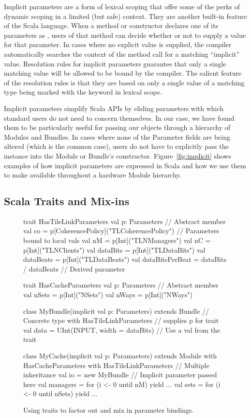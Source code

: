Implicit parameters are a form of lexical scoping that offer some of the perks of dynamic scoping in a limited (but safe) context.
They are another built-in feature of the Scala language.
When a method or constructor declares one of its parameters as , 
users of that method can decide whether or not to supply a value for that parameter.
In cases where no explicit value is supplied, the compiler automatically searches the context
of the method call for a matching ``implicit'' value.
Resolution rules for implicit parameters guarantee that only a single matching value will be allowed to be bound by the compiler.
The salient feature of the  resolution rules is that they are based on only
a single value of a matching type being marked with the  keyword in lexical scope.

Implicit parameters simplify Scala APIs by eliding parameters with which standard users do not need to concern themselves.
In our case, we have found them to be particularly useful for passing our  objects through a hierarchy of Modules and Bundles.
In cases where none of the Parameter fields are being altered (which is the common case),
users do not have to explicitly pass the  instance into the Module or Bundle's constructor.
Figure~\ref{fig:implicit} shows examples of how implicit parameters are expressed in Scala and how we use them to make 
available throughout a hardware Module hierarchy.
  
\subsection{Scala Traits and Mix-ins}

\begin{figure}
\centering
\begin{scala}
trait HasTileLinkParameters {
  val p: Parameters // Abstract member
  val co = p[CoherencePolicy]("TLCoherencePolicy") // Parameters bound to local vals
  val nM = p[Int]("TLNManagers")
  val nC = p[Int]("TLNClients")
  val dataBits = p[Int]("TLDataBits")
  val dataBeats = p[Int]("TLDataBeats")
  val dataBitsPerBeat = dataBits / dataBeats // Derived parameter
}

trait HasCacheParameters {
  val p: Parameters // Abstract member
  val nSets = p[Int]("NSets")
  val nWays = p[Int]("NWays")
}

class MyBundle(implicit val p: Parameters) extends Bundle // Concrete type
    with HasTileLinkParameters {                          // supplies p for trait
  val data = UInt(INPUT, width = dataBits) // Use a val from the trait
}

class MyCache(implicit val p: Paramaeters) extends Module
    with HasCacheParameters
    with HasTileLinkParameters { // Multiple inheritance
  val io = new MyBundle // Implicit parameter passed here
  val managers = for (i <- 0 until nM) yield { ... }
  val sets = for (i <- 0 until nSets) yield { ... }
}
\end{scala} 
\caption{Using traits to factor out and mix in parameter bindings.}
\label{fig:mixin}
\end{figure}

